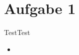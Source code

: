 \section{Aufgabe 1}

\begin{frame}[fragile]{Test}{Test}
  \begin{itemize}
    \item {}
  \end{itemize}
\end{frame}
